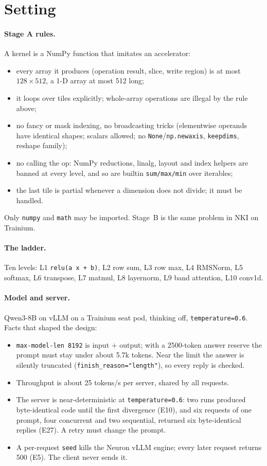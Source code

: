 \documentclass[11pt]{article}
\newcommand{\code}[1]{\texttt{#1}}
\newcommand{\E}[1]{E#1}
\begin{document}
\section{Setting}
\label{sec:setting}

\paragraph{Stage A rules.} A kernel is a NumPy function that imitates an accelerator:
\begin{itemize}
  \item every array it produces (operation result, slice, write region) is at most $128\times512$, a
        1-D array at most 512 long;
  \item it loops over tiles explicitly; whole-array operations are illegal by the rule above;
  \item no fancy or mask indexing, no broadcasting tricks (elementwise operands have identical shapes;
        scalars allowed; no \code{None}/\code{np.newaxis}, \code{keepdims}, reshape family);
  \item no calling the op: NumPy reductions, linalg, layout and index helpers are banned at every
        level, and so are builtin \code{sum/max/min} over iterables;
  \item the last tile is partial whenever a dimension does not divide; it must be handled.
\end{itemize}
Only \code{numpy} and \code{math} may be imported. Stage~B is the same problem in NKI on Trainium.

\paragraph{The ladder.} Ten levels: L1 \code{relu(a x + b)}, L2 row sum, L3 row max, L4 RMSNorm,
L5 softmax, L6 transpose, L7 matmul, L8 layernorm, L9 band attention, L10 conv1d.

\paragraph{Model and server.} Qwen3-8B on vLLM on a Trainium seat pod, thinking off,
\code{temperature=0.6}. Facts that shaped the design:
\begin{itemize}
  \item \code{max-model-len 8192} is input $+$ output; with a 2500-token answer reserve the prompt must
        stay under about 5.7k tokens. Near the limit the answer is silently truncated
        (\code{finish\_reason="length"}), so every reply is checked.
  \item Throughput is about 25 tokens/s per server, shared by all requests.
  \item The server is near-deterministic at \code{temperature=0.6}: two runs produced byte-identical
        code until the first divergence (\E{10}), and six requests of one prompt, four concurrent and two
        sequential, returned six byte-identical replies (\E{27}). A retry must change the prompt.
  \item A per-request \code{seed} kills the Neuron vLLM engine; every later request returns 500 (\E{5}).
        The client never sends it.
\end{itemize}
\end{document}
